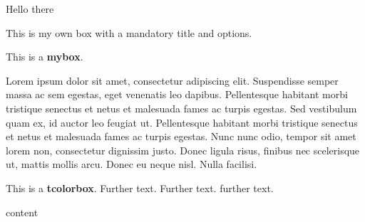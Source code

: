 \documentclass[10pt]{article}
\newcommand{\introduction}{Lorem ipsum dolor sit amet, consectetur adipiscing elit. Suspendisse semper massa ac sem egestas, eget venenatis leo dapibus. Pellentesque habitant morbi tristique senectus et netus et malesuada fames ac turpis egestas. Sed vestibulum quam ex, id auctor leo feugiat ut. Pellentesque habitant morbi tristique senectus et netus et malesuada fames ac turpis egestas. Nunc nunc odio, tempor sit amet lorem non, consectetur dignissim justo. Donec ligula risus, finibus nec scelerisque ut, mattis mollis arcu. Donec eu neque nisl. Nulla facilisi.}
\begin{document}

\vspace*{6mm}
\begin{titlebox}{Hello there}
    
    This is my own box with a mandatory title
    and options.

\end{titlebox}



\begin{mybox}[Title]{}
    This is a \textbf{mybox}.
\end{mybox}



\introduction








\begin{tcolorbox}
    This is a \textbf{tcolorbox}.
    Further text.
    Further text.
    \tcblower
    further text.
\end{tcolorbox}



content 
\end{document}
